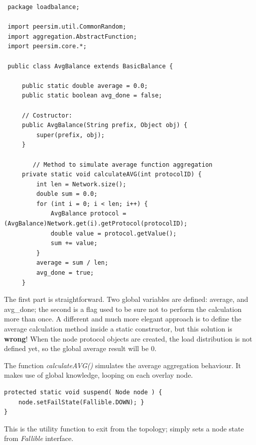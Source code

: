 \documentclass[a4paper,11pt]{article}
\begin{document}
\footnotesize
\begin{verbatim}
 package loadbalance;
 
 import peersim.util.CommonRandom;
 import aggregation.AbstractFunction;
 import peersim.core.*;
 
 public class AvgBalance extends BasicBalance {
 
     public static double average = 0.0;
     public static boolean avg_done = false;
     
     // Costructor:
     public AvgBalance(String prefix, Object obj) {
         super(prefix, obj);
     }
 
        // Method to simulate average function aggregation
     private static void calculateAVG(int protocolID) {
         int len = Network.size();
         double sum = 0.0;
         for (int i = 0; i < len; i++) {
             AvgBalance protocol = (AvgBalance)Network.get(i).getProtocol(protocolID);
             double value = protocol.getValue();
             sum += value;
         }
         average = sum / len;
         avg_done = true;
     }
\end{verbatim}
\normalsize


The first part is straightforward. Two global variables are defined:
average, and avg\_done; the second is a flag used to be sure not to
perform the calculation more than once. A different and much more
elegant approach is to define the average calculation method inside
a static constructor, but this solution is \textbf{wrong}! When the
node protocol objects are created, the load distribution is not defined
yet, so the global average result will be 0.

The function \emph{calculateAVG()} simulates the average aggregation
behaviour. It makes use of global knowledge, looping on each overlay
node. \\

\footnotesize
\begin{verbatim}
protected static void suspend( Node node ) {
    node.setFailState(Fallible.DOWN); }
}
\end{verbatim}
\normalsize

This is the utility function to exit from the topology; simply sets
a node state from \emph{Fallible} interface.\\
\end{document}
